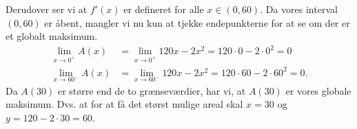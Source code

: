 \begin{enumerate}
Derudover ser vi at $f'(x)$ er defineret for alle $x \in (0,60)$. Da vores interval $(0,60)$ er åbent, mangler vi nu kun at tjekke endepunkterne for at se om der er et globalt maksimum.
\begin{align*}
\lim_{x \to 0^+}A(x)&=\lim_{x \to 0^+} 120x -2 x^2= 120 \cdot 0 - 2 \cdot 0^2 =0 \\
\lim_{x \to 60^-} A(x) &= \lim_{x \to 60^-} 120x -2 x^2 =  120\cdot 60 - 2\cdot 60^2 = 0.
\end{align*}
Da $A(30)$ er større end de to grænseværdier, har vi, at $A(30)$ er vores globale maksimum. Dvs. at for at få det størst mulige areal skal $x=30$ og $y=120-2 \cdot 30 = 60$.
\end{enumerate}







